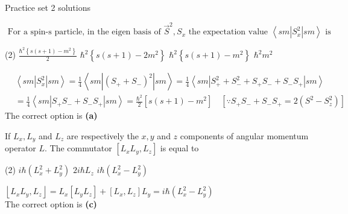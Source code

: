 \newpage
\begin{abox}
	Practice set 2 solutions
	\end{abox}
\begin{enumerate}
\begin{minipage}{\textwidth}
	\item $\text { For a spin-s particle, in the eigen basis of } \vec{S}^{2}, S_{x} \text { the expectation value }\left\langle s m\left|S_{x}^{2}\right| s m\right\rangle \text { is }$
\end{minipage}
\begin{tasks}(2)
	\task[\textbf{A.}] $\frac{\hbar^{2}\left\{s(s+1)-m^{2}\right\}}{2}$
	\task[\textbf{B.}] $\hbar^{2}\left\{s(s+1)-2 m^{2}\right\}$
	\task[\textbf{C.}]$\hbar^{2}\left\{s(s+1)-m^{2}\right\}$
	\task[\textbf{D.}]$\hbar^{2} m^{2}$
\end{tasks}
\begin{answer}
\begin{align*}
	&\left\langle s m\left|S_{x}^{2}\right| s m\right\rangle=\frac{1}{4}\left\langle s m\left|\left(S_{+}+S_{-}\right)^{2}\right| s m\right\rangle=\frac{1}{4}\left\langle s m\left|S_{+}^{2}+S_{-}^{2}+S_{+} S_{-}+S_{-} S_{+}\right| s m\right\rangle \\
	&=\frac{1}{4}\left\langle s m\left|S_{+} S_{-}+S_{-} S_{+}\right| s m\right\rangle=\frac{\hbar^{2}}{2}\left[s(s+1)-m^{2}\right] \quad\left[\because S_{+} S_{-}+S_{-} S_{+}=2\left(S^{2}-S_{z}^{2}\right)\right]
\end{align*}
The correct option is \textbf{(a)}	
\end{answer}
\begin{minipage}{\textwidth}
	\item If $L_{x}, L_{y}$ and $L_{z}$ are respectively the $x, y$ and $z$ components of angular momentum operator $L$. The commutator $\left[L_{x} L_{y}, L_{z}\right]$ is equal to
\end{minipage}
\begin{tasks}(2)
	\task[\textbf{A.}] $i \hbar\left(L_{x}^{2}+L_{y}^{2}\right)$
	\task[\textbf{B.}]$2 i \hbar L_{z}$
	\task[\textbf{C.}]$i \hbar\left(L_{x}^{2}-L_{y}^{2}\right)$
\end{tasks}
\begin{answer}
	$\left\lfloor L_{x} L_{y}, L_{z}\right\rfloor=L_{x}\left[L_{y} L_{z}\right]+\left[L_{x}, L_{z}\right] L_{y}=i \hbar\left(L_{x}^{2}-L_{y}^{2}\right)$\\
	The correct option is \textbf{(c)}
\end{answer}

\end{enumerate}
